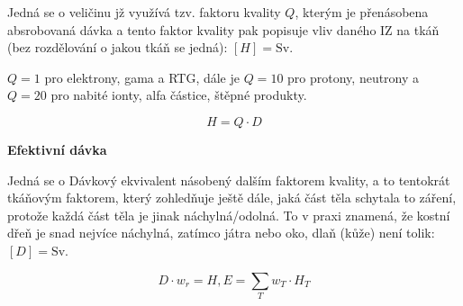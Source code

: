 Jedná se o veličinu jž využívá tzv. faktoru kvality $Q$, kterým je přenásobena absrobovaná dávka a tento faktor kvality pak popisuje vliv daného IZ na tkáň (bez rozdělování o jakou tkáň se jedná): $[H] = \text{Sv}$.

$Q = 1$ pro elektrony, gama a RTG, dále je $Q = 10$ pro protony, neutrony a $Q = 20$ pro nabité ionty, alfa částice, štěpné produkty.

\begin{equation}
    H = Q \cdot D
\end{equation}    


\textbf{Efektivní dávka}

Jedná se o Dávkový ekvivalent násobený dalším faktorem kvality, a to tentokrát tkáňovým faktorem, který zohledňuje ještě dále, jaká část těla schytala to záření, protože každá část těla je jinak náchylná/odolná. To v praxi znamená, že kostní dřeň je snad nejvíce náchylná, zatímco játra nebo oko, dlaň (kůže) není tolik: $[D] = \text{Sv}$.

\begin{equation}
    D \cdot w_r = H, E = \sum_T w_T \cdot H_T
\end{equation}

